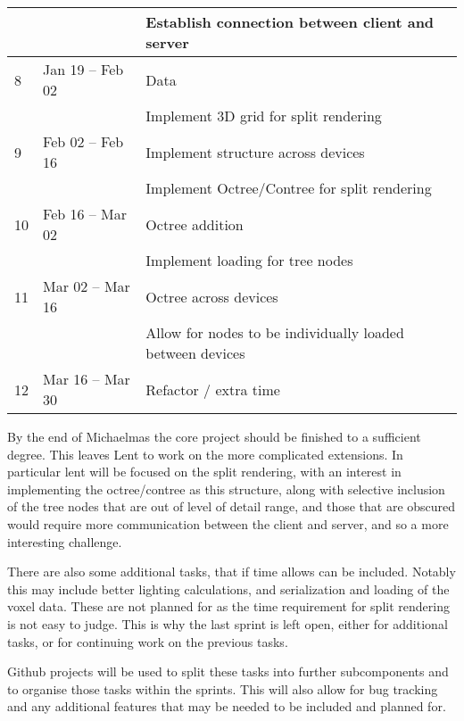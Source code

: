\begin{tabular}{lll}
  && Establish connection between client and server \\
  \hline
  8 & Jan 19 -- Feb 02 & Data \\
  && Implement 3D grid for split rendering \\
  \hline
  9 & Feb 02 -- Feb 16 & Implement structure across devices \\
  && Implement Octree/Contree for split rendering \\
  \hline
  10 & Feb 16 -- Mar 02 & Octree addition \\
  && Implement loading for tree nodes \\
  \hline
  11 & Mar 02 -- Mar 16 & Octree across devices \\
  && Allow for nodes to be individually loaded between devices \\
  \hline
  12 & Mar 16 -- Mar 30 & Refactor / extra time \\
  \hline
\end{tabular}

By the end of Michaelmas the core project should be finished to a
sufficient degree. This leaves Lent to work on the more complicated extensions.
In particular lent will be focused on the split rendering, with an interest in
implementing the octree/contree as this structure, along with
selective inclusion
of the tree nodes that are out of level of detail range, and those that are
obscured would require more communication between the client and server, and so
a more interesting challenge.

There are also some additional tasks, that if time allows can be included.
Notably this may include better lighting calculations, and serialization and
loading of the voxel data. These are not planned for as the time requirement for
split rendering is not easy to judge. This is why the last sprint is left open,
either for additional tasks, or for continuing work on the previous tasks.

Github projects will be used to split these tasks into further subcomponents and
to organise those tasks within the sprints. This will also allow for
bug tracking and any additional features that may be needed to be
included and planned for.
